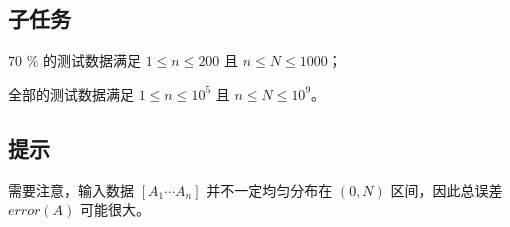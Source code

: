 \subsection*{子任务}

$70$ \% 的测试数据满足 $1\le n\le 200$ 且 $n\le N\le 1000$；

全部的测试数据满足 $1\le n\le 10^5$ 且 $n\le N\le 10^9$。

\subsection*{提示}

需要注意，输入数据 $[A_1\cdots A_n]$
 并不一定均匀分布在 $(0,N)$ 区间，因此总误差 $error(A)$ 可能很大。